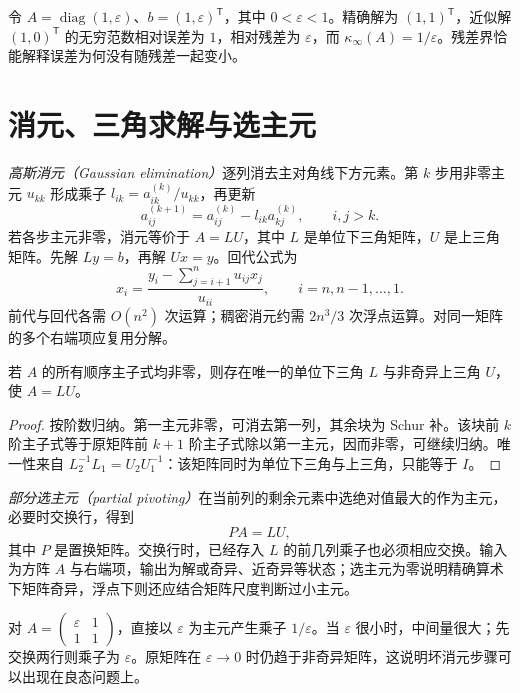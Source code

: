 \begin{example}[病态系统中的小残差]
令 $A=\operatorname{diag}(1,\varepsilon)$、$b=(1,\varepsilon)^{\mathsf T}$，其中 $0<\varepsilon<1$。精确解为 $(1,1)^{\mathsf T}$，近似解 $(1,0)^{\mathsf T}$ 的无穷范数相对误差为 $1$，相对残差为 $\varepsilon$，而 $\kappa_\infty(A)=1/\varepsilon$。残差界恰能解释误差为何没有随残差一起变小。
\end{example}

\section{消元、三角求解与选主元}
\emph{高斯消元（Gaussian elimination）}逐列消去主对角线下方元素。第 $k$ 步用非零主元 $u_{kk}$ 形成乘子 $l_{ik}=a_{ik}^{(k)}/u_{kk}$，再更新
\[
 a_{ij}^{(k+1)}=a_{ij}^{(k)}-l_{ik}a_{kj}^{(k)},\qquad i,j>k.
\]
若各步主元非零，消元等价于 $A=LU$，其中 $L$ 是单位下三角矩阵，$U$ 是上三角矩阵。先解 $Ly=b$，再解 $Ux=y$。回代公式为
\[
 x_i=\frac{y_i-\sum_{j=i+1}^{n}u_{ij}x_j}{u_{ii}},\qquad i=n,n-1,\ldots,1.
\]
前代与回代各需 $O(n^2)$ 次运算；稠密消元约需 $2n^3/3$ 次浮点运算。对同一矩阵的多个右端项应复用分解。

\begin{proposition}
若 $A$ 的所有顺序主子式均非零，则存在唯一的单位下三角 $L$ 与非奇异上三角 $U$，使 $A=LU$。
\end{proposition}
\begin{proof}
按阶数归纳。第一主元非零，可消去第一列，其余块为 Schur 补。该块前 $k$ 阶主子式等于原矩阵前 $k+1$ 阶主子式除以第一主元，因而非零，可继续归纳。唯一性来自 $L_2^{-1}L_1=U_2U_1^{-1}$：该矩阵同时为单位下三角与上三角，只能等于 $I$。
\end{proof}

\emph{部分选主元（partial pivoting）}在当前列的剩余元素中选绝对值最大的作为主元，必要时交换行，得到
\begin{equation}
 PA=LU,
 \label{eq:na-plu}
\end{equation}
其中 $P$ 是置换矩阵。交换行时，已经存入 $L$ 的前几列乘子也必须相应交换。输入为方阵 $A$ 与右端项，输出为解或奇异、近奇异等状态；选主元为零说明精确算术下矩阵奇异，浮点下则还应结合矩阵尺度判断过小主元。

\begin{example}[小主元引起的中间量放大]
对 $A=\begin{pmatrix}\varepsilon&1\\1&1\end{pmatrix}$，直接以 $\varepsilon$ 为主元产生乘子 $1/\varepsilon$。当 $\varepsilon$ 很小时，中间量很大；先交换两行则乘子为 $\varepsilon$。原矩阵在 $\varepsilon\to0$ 时仍趋于非奇异矩阵，这说明坏消元步骤可以出现在良态问题上。
\end{example}

